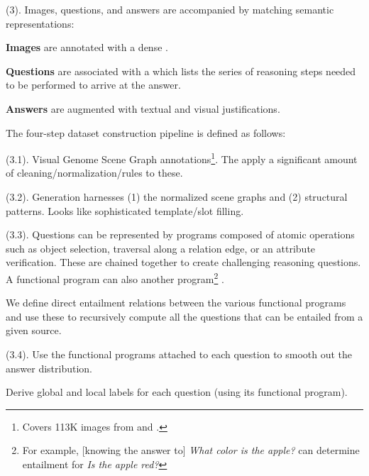 \documentclass[11pt]{article}
\begin{document}
 (3). Images, questions, and answers are accompanied by matching semantic representations:
\begin{compactitem}
	\item \textbf{Images} are annotated with a dense . 
	\item \textbf{Questions} are associated with a  which lists the series of reasoning steps needed to be performed to arrive at the answer.
	\item \textbf{Answers} are augmented with textual and visual justifications.
\end{compactitem}
The four-step dataset construction pipeline is defined as follows:
\begin{compactenum}
	\item {} (3.1). Visual Genome Scene Graph annotations\footnote{Covers 113K images from  and .}. The apply a significant amount of cleaning/normalization/rules to these. 
	
	\item {} (3.2). Generation harnesses (1) the normalized scene graphs and (2) structural patterns. Looks like sophisticated template/slot filling.
	
	\item {} (3.3). Questions can be represented by programs composed of atomic operations such as object selection, traversal along a relation edge, or an attribute verification. These are chained together to create challenging reasoning questions. A functional program can also  another program\footnote{For example, [knowing the answer to] \textit{What color is the apple?} can determine entailment for \textit{Is the apple red?}} . 
	
	\begin{myquote}[-0.3em]
		We define direct entailment relations between the various functional programs and use these to recursively compute all the questions that can be entailed from a given source.
	\end{myquote}
	
	\item {} (3.4). Use the functional programs attached to each question to smooth out the answer distribution.
	\begin{compactenum}
		\item Derive global and local labels for each question (using its functional program). 
		

\end{compactenum}
\end{compactenum}
\end{document}
